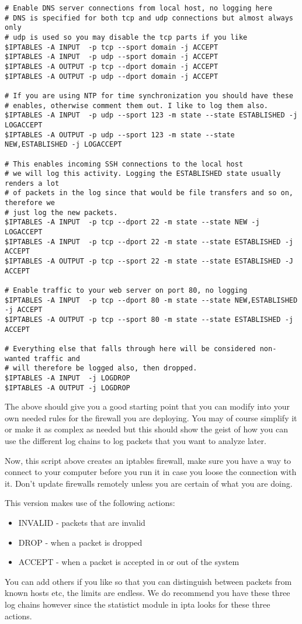 \documentclass[english,twoside,openright,a4paper,12pt]{article}
\begin{document}
\begin{verbatim}
# Enable DNS server connections from local host, no logging here
# DNS is specified for both tcp and udp connections but almost always only 
# udp is used so you may disable the tcp parts if you like
$IPTABLES -A INPUT  -p tcp --sport domain -j ACCEPT
$IPTABLES -A INPUT  -p udp --sport domain -j ACCEPT
$IPTABLES -A OUTPUT -p tcp --dport domain -j ACCEPT
$IPTABLES -A OUTPUT -p udp --dport domain -j ACCEPT

# If you are using NTP for time synchronization you should have these
# enables, otherwise comment them out. I like to log them also.
$IPTABLES -A INPUT  -p udp --sport 123 -m state --state ESTABLISHED -j LOGACCEPT 
$IPTABLES -A OUTPUT -p udp --sport 123 -m state --state NEW,ESTABLISHED -j LOGACCEPT

# This enables incoming SSH connections to the local host
# we will log this activity. Logging the ESTABLISHED state usually renders a lot 
# of packets in the log since that would be file transfers and so on, therefore we 
# just log the new packets.
$IPTABLES -A INPUT  -p tcp --dport 22 -m state --state NEW -j LOGACCEPT
$IPTABLES -A INPUT  -p tcp --dport 22 -m state --state ESTABLISHED -j ACCEPT 
$IPTABLES -A OUTPUT -p tcp --sport 22 -m state --state ESTABLISHED -J ACCEPT

# Enable traffic to your web server on port 80, no logging
$IPTABLES -A INPUT  -p tcp --dport 80 -m state --state NEW,ESTABLISHED -j ACCEPT 
$IPTABLES -A OUTPUT -p tcp --sport 80 -m state --state ESTABLISHED -j ACCEPT

# Everything else that falls through here will be considered non-wanted traffic and 
# will therefore be logged also, then dropped.
$IPTABLES -A INPUT  -j LOGDROP
$IPTABLES -A OUTPUT -j LOGDROP

\end{verbatim}

The above should give you a good starting point that you can modify into your own needed rules for the firewall you are deploying. You may of course simplify it or make it as complex as needed but this should show the geist of how you can use the different log chains to log packets that you want to analyze later.

Now, this script above creates an iptables firewall, make sure you have a way to connect to your computer before you run it in case you loose the connection with it. Don't update firewalls remotely unless you are certain of what you are doing.

This version makes use of the following actions:

\begin{itemize}
	\item INVALID - packets that are invalid
	\item DROP - when a packet is dropped
	\item ACCEPT - when a packet is accepted in or out of the system
\end{itemize}

You can add others if you like so that you can distinguish between packets from known hosts etc, the limits are endless. We do recommend you have these three log chains however since the statistict module in ipta looks for these three actions.
\end{document}
